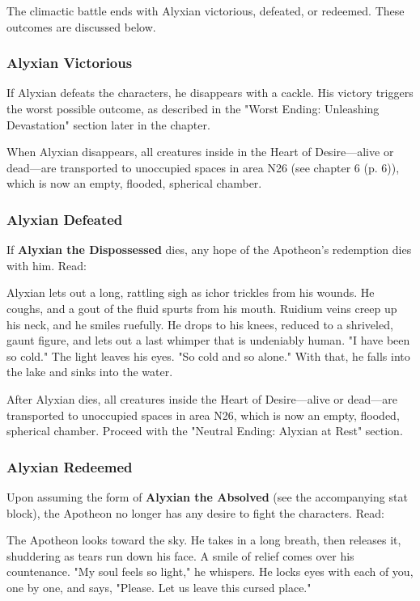 \documentclass[a4paper, 11pt, bg=full, twocolumn, nooutline]{dndbook}
\begin{document}
The climactic battle ends with Alyxian victorious, defeated, or redeemed. These outcomes are discussed below.

\subsubsection{Alyxian Victorious}

If Alyxian defeats the characters, he disappears with a cackle. His victory triggers the worst possible outcome, as described in the "Worst Ending: Unleashing Devastation" section later in the chapter.

When Alyxian disappears, all creatures inside in the Heart of Desire---alive or dead---are transported to unoccupied spaces in area N26 (see chapter 6 (p. 6)), which is now an empty, flooded, spherical chamber.

\subsubsection{Alyxian Defeated}

If \textbf{Alyxian the Dispossessed} dies, any hope of the Apotheon's redemption dies with him. Read:

\begin{DndReadAloud}
Alyxian lets out a long, rattling sigh as ichor trickles from his wounds. He coughs, and a gout of the fluid spurts from his mouth. Ruidium veins creep up his neck, and he smiles ruefully. He drops to his knees, reduced to a shriveled, gaunt figure, and lets out a last whimper that is undeniably human.
"I have been so cold." The light leaves his eyes. "So cold and so alone." With that, he falls into the lake and sinks into the water.
\end{DndReadAloud}

After Alyxian dies, all creatures inside the Heart of Desire---alive or dead---are transported to unoccupied spaces in area N26, which is now an empty, flooded, spherical chamber. Proceed with the "Neutral Ending: Alyxian at Rest" section.

\subsubsection{Alyxian Redeemed}

Upon assuming the form of \textbf{Alyxian the Absolved} (see the accompanying stat block), the Apotheon no longer has any desire to fight the characters. Read:

\begin{DndReadAloud}
The Apotheon looks toward the sky. He takes in a long breath, then releases it, shuddering as tears run down his face. A smile of relief comes over his countenance.
"My soul feels so light," he whispers. He locks eyes with each of you, one by one, and says, "Please. Let us leave this cursed place."
\end{DndReadAloud}
\end{document}
